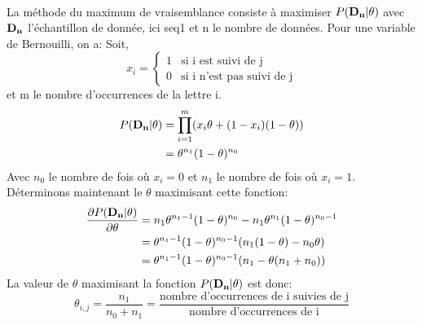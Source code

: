 \documentclass[11pt]{report}
\begin{document}
\paragraph{}
La méthode du maximum de vraisemblance consiste à maximiser $P(\bf{D}_n|\theta)$ avec $\bf{D}_n$ l'échantillon de donnée, ici seq1 et n le nombre de données. Pour une variable de Bernouilli, on a: Soit,\\ 
$$
\mbox{} x_i = \left\{
    \begin{array}{ll}
        1 & \mbox{si i est suivi de j} \\
        0 & \mbox{si i n'est pas suivi de j}
    \end{array}
\right.
$$
et m le nombre d’occurrences de la lettre i.
\begin{align*}
P(\bf{D}_n|\theta) &= \prod_{i = 1}^{m} (x_i \theta +(1-x_i)(1-\theta)) \\
                   &= \theta^{n_1} (1-\theta)^{n_0}
\end{align*}
Avec $n_0$ le nombre de fois où $x_i = 0$ et $n_1$ le nombre de fois où $x_i = 1$. Déterminons maintenant le $\theta$ maximisant cette fonction:
\begin{align*}
\frac{\partial P(\bf{D}_n|\theta)}{\partial \theta} 
&= n_1 \theta^{n_1-1} (1-\theta)^{n_0} - n_1\theta^{n_1} (1-\theta)^{n_0-1} \\
&= \theta^{n_1-1} (1-\theta)^{n_0-1} (n_1 (1-\theta) - n_0 \theta) \\
&= \theta^{n_1-1} (1-\theta)^{n_0-1} (n_1 - \theta (n_1 + n_0))
\end{align*}
La valeur de $\theta$ maximisant la fonction $P(\bf{D}_n|\theta)$ est donc:
$$ \theta_{i,j} = \frac{n_1}{n_0+n_1} = \frac{\mbox{nombre d'occurrences de i suivies de j}}{\mbox{nombre d'occurrences de i}} $$
\end{document}
